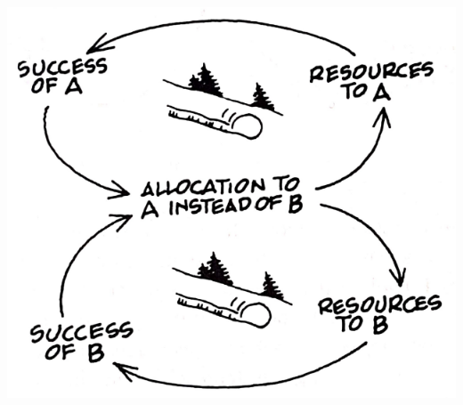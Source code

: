 \begin{multicols}{3}
	\includegraphics[width=0.8\linewidth]{pictures/archetype9}\\
\end{multicols}

